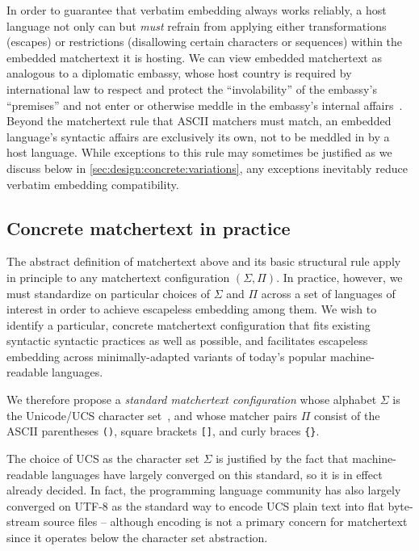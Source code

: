 In order to guarantee that verbatim embedding always works reliably,
a host language not only can but \emph{must} refrain
from applying either transformations (\eg escapes)
or restrictions (\eg disallowing certain characters or sequences)
within the embedded matchertext it is hosting.
We can view embedded matchertext as analogous to a diplomatic embassy,
whose host country is required by international law to respect and protect
the ``involability'' of the embassy's ``premises''
and not enter or otherwise meddle in
the embassy's internal affairs~\cite[Article 22]{un61vienna}.
Beyond the matchertext rule that ASCII matchers must match,
an embedded language's syntactic affairs are exclusively its own,
not to be meddled in by a host language.
While exceptions to this rule may sometimes be justified
as we discuss below in \cref{sec:design:concrete:variations},
any exceptions inevitably reduce verbatim embedding compatibility.


\subsection{Concrete matchertext in practice}
\label{sec:design:concrete}

The abstract definition of matchertext above
and its basic structural rule apply in principle
to any matchertext configuration $(\Sigma,\Pi)$.
In practice, however,
we must standardize on particular choices of $\Sigma$ and $\Pi$
across a set of languages of interest
in order to achieve escapeless embedding among them.
We wish to identify a particular, concrete matchertext configuration
that fits existing syntactic syntactic practices as well as possible,
and facilitates escapeless embedding across 
minimally-adapted variants of today's popular machine-readable languages.

We therefore propose a \emph{standard matchertext configuration}
whose alphabet $\Sigma$ is the Unicode/UCS character set~\cite{iso10646ucs},
and whose matcher pairs $\Pi$ consist of
the ASCII parentheses \verb|()|,
square brackets \verb|[]|,
and curly braces \verb|{}|.

The choice of UCS as the character set $\Sigma$
is justified by the fact that machine-readable languages
have largely converged on this standard,
so it is in effect already decided.
In fact, the programming language community has also largely converged
on UTF-8 as the standard way to encode UCS plain text
into flat byte-stream source files --
although encoding is not a primary concern for matchertext
since it operates below the character set abstraction.


